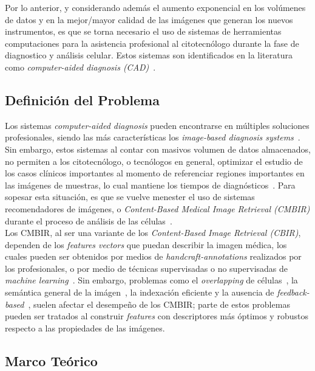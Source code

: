 \documentclass[10pt]{article}
\begin{document}
Por lo anterior, y considerando además el aumento exponencial en los volúmenes de datos y en la mejor/mayor calidad de las imágenes que generan los nuevos instrumentos, es que se torna necesario el uso de sistemas de herramientas computaciones para la asistencia profesional al citotecnólogo durante la fase de diagnostico y análisis celular. Estos sistemas son identificados en la literatura como \textit{computer-aided diagnosis (CAD)}~\cite{DOI2007198}.

\subsection{Definición del Problema}
Los sistemas \textit{computer-aided diagnosis} pueden encontrarse en múltiples soluciones profesionales, siendo las más características los \textit{image-based diagnosis systems}~\cite{Mller2004}. Sin embargo, estos sistemas al contar con masivos volumen de datos almacenados, no permiten a los citotecnólogo, o tecnólogos en general, optimizar el estudio de los casos clínicos importantes al momento de referenciar regiones importantes en las imágenes de muestras, lo cual mantiene los tiempos de diagnósticos~\cite{10.1007/978-3-642-11769-5_1}.
Para sopesar esta situación, es que se vuelve menester el uso de sistemas recomendadores de imágenes, o \textit{Content-Based Medical Image Retrieval (CMBIR)} durante el proceso de análisis de las células~\cite{10.1117/12.769440}.\\

Los CMBIR, al ser una variante de los \textit{Content-Based Image Retrieval (CBIR)}, dependen de los \textit{features vectors} que puedan describir la imagen médica, los cuales pueden ser obtenidos por medios de \textit{handcraft-annotations} realizados por los profesionales, o por medio de técnicas supervisadas o no supervisadas de \textit{machine learning}~\cite{895972}.
Sin embargo, problemas como el \textit{overlapping} de células~\cite{Zhao2022}, la semántica general de la imágen~\cite{9046839}, la indexación eficiente y la ausencia de \textit{feedback-based}~\cite{9606873}, suelen afectar el desempeño de los CMBIR; parte de estos problemas pueden ser tratados al construir \textit{features} con descriptores más óptimos y robustos respecto a las propiedades de las imágenes.

\subsection{Marco Teórico}
\end{document}
